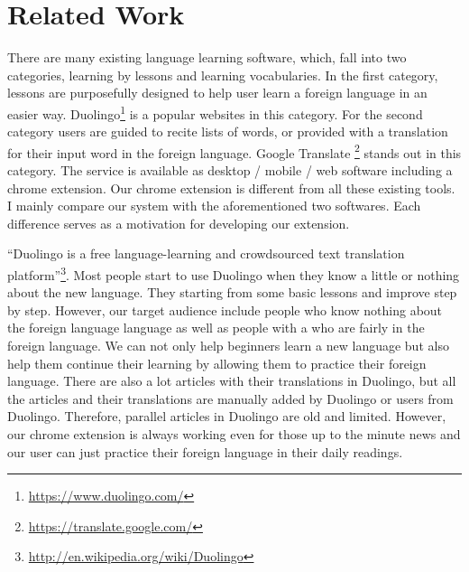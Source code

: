 \section{Related Work}
There are many existing language learning software, which, fall into two categories, learning by  
lessons and learning vocabularies. In the first category, %
lessons are purposefully designed to help user learn a foreign language in an easier way.
Duolingo\footnote{\url{https://www.duolingo.com/}} is a popular websites in this category. 
For the second category
users are guided to recite lists of words, or provided with a translation for their input word 
in the foreign language.
Google Translate \footnote{\url{https://translate.google.com/}} stands out in this category. The service 
is available as desktop / mobile / web software including a chrome extension. Our chrome extension is 
different from all these existing tools. 
I mainly compare our system  with the aforementioned two softwares. Each difference serves as a motivation 
for developing our extension.

``Duolingo is a free language-learning and crowdsourced text translation platform''\footnote{\url{http://en.wikipedia.org/wiki/Duolingo}}.
Most people start to use Duolingo when they know a little or nothing about the new language. They starting 
from some basic lessons and improve step by step.
However, our target audience include people who know nothing about the foreign language language as well as people with a who are 
fairly in the foreign language. We can not only help beginners learn a new language but also help them continue their learning 
by allowing them to practice their foreign language. There are also a lot articles with their translations in Duolingo, but 
all the articles and their translations are manually added by Duolingo or users from Duolingo. Therefore, parallel articles in Duolingo 
are old and limited. However, our chrome extension is always working even for those up to the minute news and our user can just practice 
their foreign language in their daily readings.

